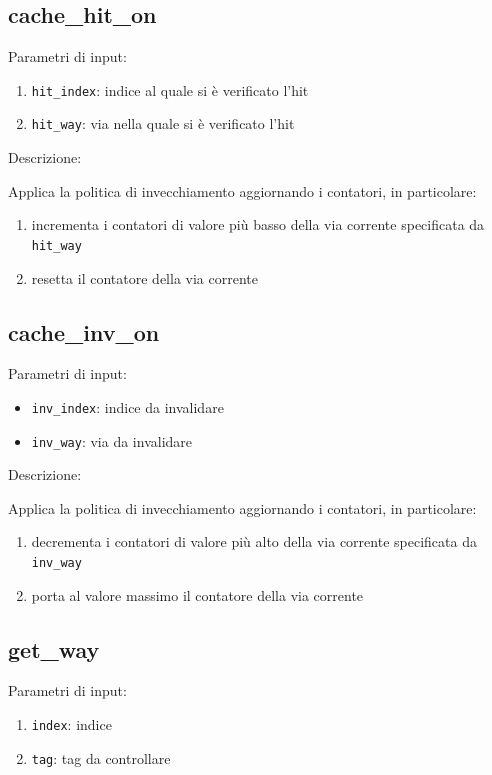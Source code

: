 \subsection{cache\_hit\_on} %

Parametri di input:
\begin{enumerate}
  \item \texttt{hit\_index}: indice al quale si \`e verificato l'hit
  \item \texttt{hit\_way}: via nella quale si \`e verificato l'hit
\end{enumerate}

Descrizione:

Applica la politica di invecchiamento aggiornando i contatori, in particolare:
\begin{enumerate}
  \item incrementa i contatori di valore pi\`u basso della via corrente specificata da \texttt{hit\_way}
  \item resetta il contatore della via corrente
\end{enumerate}	

\subsection{cache\_inv\_on} %

Parametri di input:
\begin{itemize}
  \item \texttt{inv\_index}: indice da invalidare
  \item \texttt{inv\_way}: via da invalidare
\end{itemize}

Descrizione:

Applica la politica di invecchiamento aggiornando i contatori, in particolare:
\begin{enumerate}
  \item decrementa i contatori di valore pi\`u alto della via corrente specificata da \texttt{inv\_way}
  \item porta al valore massimo il contatore della via corrente
\end{enumerate}	
	

\subsection{get\_way} %

Parametri di input:
\begin{enumerate}
  \item \texttt{index}: indice
  \item \texttt{tag}: tag da controllare
\end{enumerate}	

